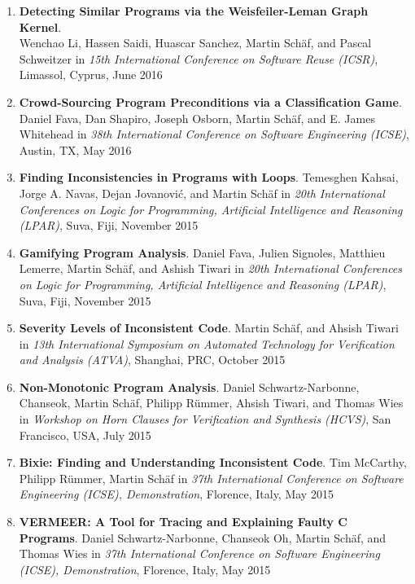 \begin{enumerate}
\item \textbf{Detecting Similar Programs via the Weisfeiler-Leman Graph Kernel}.
\\ Wenchao Li, Hassen Saidi, Huascar Sanchez, Martin Sch\"af, and Pascal
Schweitzer in \emph{15th International Conference on Software Reuse (ICSR)},
Limassol, Cyprus, June 2016


\item \textbf{Crowd-Sourcing Program Preconditions via a Classification Game}.
\\ Daniel Fava, Dan Shapiro, Joseph Osborn, Martin Sch\"af, and E. James
Whitehead in \emph{38th International Conference on Software Engineering (ICSE)}, Austin,
TX, May 2016


\item \textbf{Finding Inconsistencies in Programs with Loops}.
Temesghen Kahsai, Jorge A. Navas, Dejan Jovanovi\'c, and Martin Sch\"af
in \emph{20th International Conferences on Logic for Programming, Artificial Intelligence and Reasoning (LPAR)}, Suva, Fiji, November
2015

\item \textbf{Gamifying Program Analysis}.
Daniel Fava, Julien Signoles, Matthieu Lemerre, Martin Sch\"af, and Ashish Tiwari
in \emph{20th International Conferences on Logic for Programming, Artificial Intelligence and Reasoning (LPAR)}, Suva, Fiji, November
2015

\item \textbf{Severity Levels of Inconsistent Code}.
Martin Sch\"af, and Ahsish Tiwari in \emph{13th International
Symposium on Automated Technology for Verification and Analysis (ATVA)},
Shanghai, PRC, October 2015

\item \textbf{Non-Monotonic Program Analysis}.
Daniel Schwartz-Narbonne, Chanseok, Martin Sch\"af, Philipp R\"ummer, Ahsish
Tiwari, and Thomas Wies in \emph{Workshop on Horn Clauses for Verification and
Synthesis (HCVS)}, San Francisco, USA, July 2015


\item \textbf{Bixie: Finding and Understanding Inconsistent Code}.
Tim McCarthy, Philipp R\"ummer, Martin Sch\"af 
in \emph{37th International Conference on Software Engineering (ICSE),
Demonstration}, Florence, Italy, May 2015


\item \textbf{VERMEER: A Tool for Tracing and Explaining Faulty C Programs}.
Daniel Schwartz-Narbonne, Chanseok Oh, Martin Sch\"af, and Thomas Wies 
in \emph{37th International Conference on Software Engineering (ICSE),
Demonstration}, Florence, Italy, May 2015



\end{enumerate}
